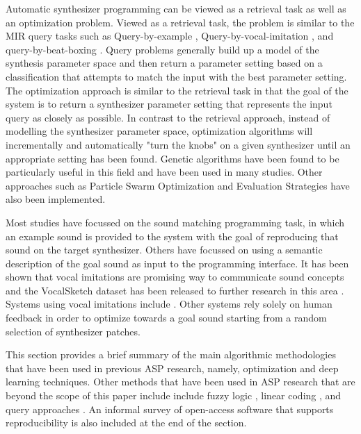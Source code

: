 Automatic synthesizer programming can be viewed as a retrieval task as well as an optimization problem. Viewed as a retrieval task, the problem is similar to the MIR query tasks such as Query-by-example \cite{zloof1977query}, Query-by-vocal-imitation \cite{blancas2014sound}, and query-by-beat-boxing \cite{kapur2004query}. Query problems generally build up a model of the synthesis parameter space and then return a parameter setting based on a classification that attempts to match the input with the best parameter setting. The optimization approach is similar to the retrieval task in that the goal of the system is to return a synthesizer parameter setting that represents the input query as closely as possible. In contrast to the retrieval approach, instead of modelling the synthesizer parameter space, optimization algorithms will incrementally and automatically "turn the knobs" on a given synthesizer until an appropriate setting has been found. Genetic algorithms have been found to be particularly useful in this field and have been used in many studies. Other approaches such as Particle Swarm Optimization and Evaluation Strategies have also been implemented. 

 Most studies have focussed on the sound matching programming task, in which an example sound is provided to the system with the goal of reproducing that sound on the target synthesizer. Others have focussed on using a semantic description of the goal sound as input to the programming interface. It has been shown that vocal imitations are promising way to communicate sound concepts \cite{lemaitre2014effectiveness} and the VocalSketch dataset has been released to further research in this area \cite{cartwright2015vocalsketch}. Systems using vocal imitations include \cite{mcartwright2014}\cite{zhang2018visualization}. Other systems rely solely on human feedback in order to optimize towards a goal sound starting from a random selection of synthesizer patches.
 
This section provides a brief summary of the main algorithmic methodologies that have been used in previous ASP research, namely, optimization and deep learning techniques. Other methods that have been used in ASP research that are beyond the scope of this paper include  include fuzzy logic \cite{mitchell2005frequency, hamadicharef2012intelligent}, linear coding \cite{mintz2007toward}, and query approaches \cite{mcartwright2014}. An  informal survey of open-access software that supports reproducibility is also included at the end of the section.

